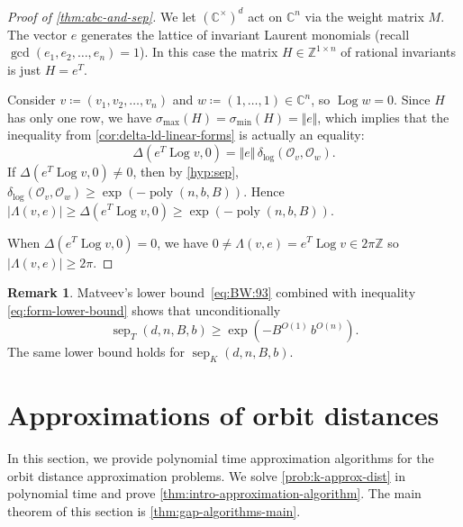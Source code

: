 \documentclass[10pt,a4paper]{article}
\theoremstyle{definition}
\newtheorem{remark}[theorem]{Remark}
\DeclareMathOperator{\poly}{poly}
\DeclareMathOperator{\sep}{sep}
\DeclareMathOperator{\Log}{Log}
\newcommand{\distLD}{\delta_{\log}}
\newcommand{\CC}{\mathbb{C}}
\newcommand{\ZZ}{\mathbb{Z}}
\newcommand{\OO}{\ensuremath{\mathcal{O}}}
\numberwithin{equation}{section}
\begin{document}
\begin{proof}[Proof of \cref{thm:abc-and-sep}]
We let $(\CC^\times)^d$ act on $\CC^n$ via the weight matrix $M$.
The vector $e$ generates the lattice of invariant Laurent monomials
(recall $\gcd(e_1,e_2,\dots,e_n)=1$).
In this case the matrix $H\in\ZZ^{1\times n}$ of rational invariants is just $H=e^T$.

Consider $v\coloneqq (v_1,v_2,\dots,v_n)$ and
$w\coloneqq (1,\ldots,1) \in\CC^n$, so $\Log w =0$.
Since $H$ has only one row, we have $\sigma_{\max}(H)=\sigma_{\min}(H)=\Vert e\Vert$,
which implies that the inequality from \cref{cor:delta-ld-linear-forms}
is actually an equality:
\begin{equation}\label{eq:Delta-delta}
  \Delta(e^T\Log v, 0) = \Vert e\Vert\,\distLD(\OO_v,\OO_w).
\end{equation}
If $\Delta(e^T\Log v, 0) \ne 0$, then by
\cref{hyp:sep},
$\distLD(\OO_v,\OO_w) \ge \exp(-\poly(n,b,B))$.
Hence
$|\Lambda(v,e)| \geq \Delta(e^T\Log v,0)\ge \exp(-\poly(n,b,B))$.

When $\Delta(e^T\Log v, 0) =0$, we have
$0 \ne \Lambda(v,e) = e^T\Log v \in 2\pi\ZZ$ so $|\Lambda(v,e)| \ge 2\pi$.
\end{proof}

\begin{remark}
Matveev's lower bound~\eqref{eq:BW:93}
combined with inequality \cref{eq:form-lower-bound}
shows that unconditionally
\[
   \sep_T(d,n,B,b)\geq \exp( - B^{O(1)}\, b^{O(n)}) .
\]
The same lower bound holds for $\sep_K(d,n,B,b)$.
\end{remark}

\section{Approximations of orbit distances}\label{sec:main-approx}

In this section, we provide polynomial time approximation algorithms
for the orbit distance approximation problems.
We solve \cref{prob:k-approx-dist} in polynomial time and prove
\cref{thm:intro-approximation-algorithm}.
The main theorem of this section is \cref{thm:gap-algorithms-main}.

\end{document}
